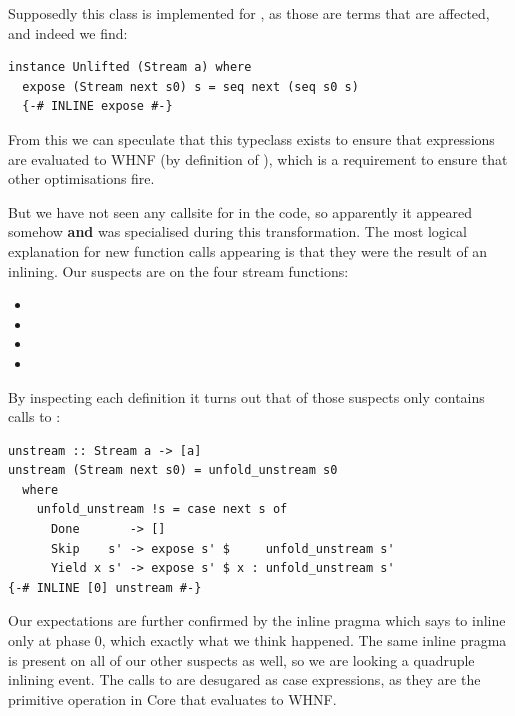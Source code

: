 Supposedly this class is implemented for , as those are terms that are affected, and indeed we find:

\begin{listing}[H]
\begin{verbatim}
instance Unlifted (Stream a) where
  expose (Stream next s0) s = seq next (seq s0 s)
  {-# INLINE expose #-}
\end{verbatim}
\end{listing}

From this we can speculate that this typeclass exists to ensure that expressions are evaluated to WHNF (by definition of ),
which is a requirement to ensure that other optimisations fire.

But we have not seen any callsite for  in the code, so apparently it appeared somehow \textbf{and} was specialised 
during this transformation. The most logical explanation for new function calls appearing is that they were the result of an inlining.
Our suspects are on the four stream functions:

\begin{itemize}
\item {}
\item {}
\item {}
\item {}
\end{itemize}

By inspecting each definition it turns out that of those suspects only  contains calls to :

\begin{listing}[H]
\begin{verbatim}
unstream :: Stream a -> [a]
unstream (Stream next s0) = unfold_unstream s0
  where
    unfold_unstream !s = case next s of
      Done       -> []
      Skip    s' -> expose s' $     unfold_unstream s'
      Yield x s' -> expose s' $ x : unfold_unstream s'
{-# INLINE [0] unstream #-}
\end{verbatim}
\end{listing}

Our expectations are further confirmed by the inline pragma which says to inline only at phase 0, which exactly what we think happened.
The same inline pragma is present on all of our other suspects as well, so we are looking a quadruple inlining event. The calls to 
are desugared as case expressions, as they are the primitive operation in Core that evaluates to WHNF.

